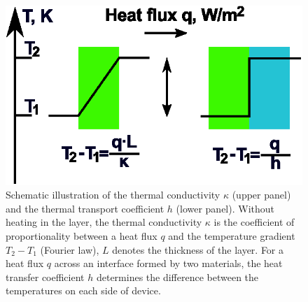 \documentclass[%
9pt,
 aip,
rsi,%
 amsmath,amssymb,
preprint,%
]{revtex4-1}
\begin{document}
\begin{figure}
    \centering	
    \includegraphics{new_bc.eps}
    \caption{ Schematic illustration of the thermal conductivity $\kappa$ (upper panel) and the thermal transport coefficient $h$ (lower panel). Without heating in the layer, the thermal conductivity $\kappa$ is the coefficient of proportionality between a heat flux $q$ and the temperature gradient $T_2 - T_1$ (Fourier law), $L$ denotes the thickness of the layer. For a heat flux $q$ across an interface formed by two materials, the heat transfer coefficient $h$ determines the difference between the temperatures on each side of device.}
    \label{fig:bcpic}
\end{figure}
\end{document}
